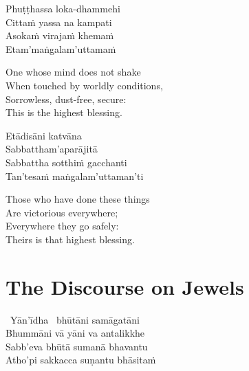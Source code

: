 \ifbfive\clearpage\fi
\ifninebythirteen\clearpage\fi

\begin{pali-hang-continued}
  Phuṭṭhassa loka-dhammehi\\
  Cittaṁ yassa na kampati\\
  Asokaṁ virajaṁ khemaṁ\\
  Etam'maṅgalam'uttamaṁ
\end{pali-hang-continued}

\ifafive\clearpage\fi

\begin{english-verses}
  One whose mind does not shake\\
  When touched by worldly conditions,\\
  Sorrowless, dust-free, secure:\\
  This is the highest blessing.
\end{english-verses}

\begin{pali-hang-continued}
  Etādisāni katvāna\\
  Sabbattham'aparājitā\\
  Sabbattha sotthiṁ gacchanti\\
  Tan'tesaṁ maṅgalam'uttaman'ti
\end{pali-hang-continued}

\begin{english-verses}
  Those who have done these things\\
  Are victorious everywhere;\\
  Everywhere they go safely:\\
  Theirs is that highest blessing.
\end{english-verses}

\suttaRef{[Snp 2.4]}



\section{The Discourse on Jewels}
\label{discourse-on-jewels}

\begin{pali-hang-together}
  \anglebracketleft\ \hspace{-0.5mm}Yān'īdha \hspace{-0.5mm}\anglebracketright\ bhūtāni samāgatāni\\
  Bhummāni vā yāni va antalikkhe\\
  Sabb'eva bhūtā sumanā bhavantu\\
  Atho'pi sakkacca suṇantu bhāsitaṁ
\end{pali-hang-together}

